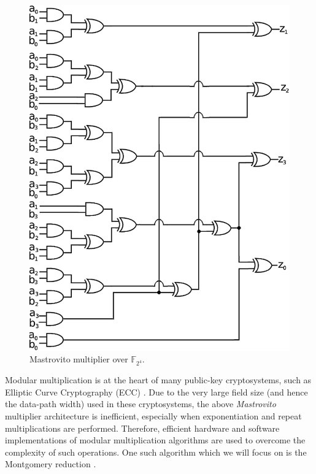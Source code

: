 \begin{figure}[H]
	\begin{center}
	\includegraphics[scale=0.60]{figures/mul4bit.eps}
	\end{center}
	\caption{Mastrovito multiplier over $\mathbb{F}_{2^4}$.}
	\label{fig:mas4}
\end{figure}

Modular multiplication is at the heart of many public-key cryptosystems, 
such as Elliptic Curve Cryptography (ECC) \cite{ecc:1986}. 
Due to the very large field size (and hence the data-path width) used in these cryptosystems, 
the above {\it Mastrovito} multiplier architecture is inefficient, especially when 
exponentiation and repeat multiplications are performed.
Therefore, efficient hardware and software implementations of modular multiplication 
algorithms are used to overcome the complexity of such operations. 
One such algorithm which we will focus on is the Montgomery reduction \cite{PT:1985} \cite{acar:1998}.

